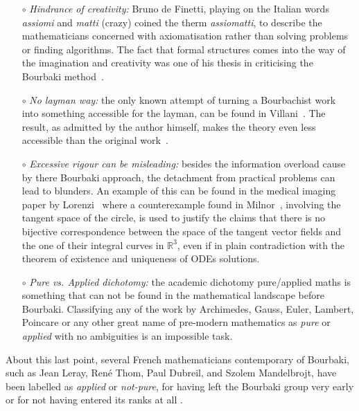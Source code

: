 \documentclass[]{scrartcl}
\theoremstyle{definition}
\begin{document}
\begin{itemize}
    \item[$\circ$] \emph{Hindrance of creativity:} Bruno de Finetti, playing on the Italian words \emph{assiomi} and \emph{matti} (crazy) coined the therm \emph{assiomatti}, to describe the mathematicians concerned with axiomatisation rather than solving problems or finding algorithms. The fact that formal structures comes into the way of the imagination and creativity was one of his thesis in criticising the Bourbaki method~\cite{de2008bruno}.

    \item[$\circ$] \emph{No layman way:} the only known attempt of turning a Bourbachist work into something accessible for the layman, can be found in Villani~\cite{villani2003livingtheorem}. The result, as admitted by the author himself, makes the theory even less accessible than the original 
    work~\cite{moskowitz2015truth}.
    
    \item[$\circ$] \emph{Excessive rigour can be misleading:} besides the information overload cause by there Bourbaki approach, the detachment from practical problems can lead to blunders. An example of this can be found in the medical imaging paper by Lorenzi~\cite{lorenzi2013geodesics} where a counterexample found in Milnor~\cite{milnor1984remarks}, involving the tangent space of the circle, is used to justify the claims that there is no bijective correspondence between the space of the tangent vector fields and the one of their integral curves in $\mathbb{R}^3$, even if in plain contradiction with the theorem of existence and uniqueness of ODEs solutions.

    \item[$\circ$] \emph{Pure vs. Applied dichotomy:} the academic dichotomy pure/applied maths is something that can not be found in the mathematical landscape before Bourbaki. 
    Classifying any of the work by Archimedes, Gauss, Euler, Lambert, Poincare or any other great name of pre-modern mathematics as \emph{pure} or \emph{applied} with no ambiguities is an impossible task.
     
\end{itemize}

About this last point, several French mathematicians contemporary of Bourbaki, such as Jean Leray, René Thom, Paul Dubreil, and Szolem Mandelbrojt, have been labelled as \emph{applied} or \emph{not-pure}, for having left the Bourbaki group very early or for not having entered its ranks at all \cite{barcellos1984interview, atiyah2007bourbaki}.
\end{document}
